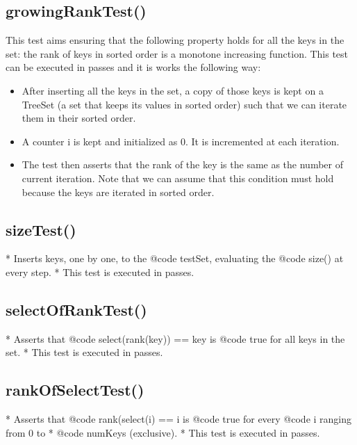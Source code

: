 \subsection{{\ttfamily growingRankTest()}} This test aims ensuring that the following property holds for all the keys in the set: the rank of keys in sorted order is a monotone increasing function. This test can be executed in passes and it is works the following way:
\begin{itemize}
    \item After inserting all the keys in the set, a copy of those keys is kept on a {\ttfamily TreeSet} (a set that keeps its values in sorted order) such that we can iterate them in their sorted order.
    \item A counter {\ttfamily i} is kept and initialized as $0$. It is incremented at each iteration.
    \item The test then asserts that the rank of the key is the same as the number of current iteration. Note that we can assume that this condition must hold because the keys are iterated in sorted order. 
\end{itemize}

\subsection{{\ttfamily sizeTest()}}
   * Inserts keys, one by one, to the {@code testSet}, evaluating the {@code size()} at every step.
   * This test is executed in passes.

\subsection{{\ttfamily selectOfRankTest()}}

   * Asserts that {@code select(rank(key)) == key} is {@code true} for all keys in the set.
   * This test is executed in passes.

\subsection{{\ttfamily rankOfSelectTest()}}

   * Asserts that {@code rank(select(i) == i} is {@code true} for every {@code i} ranging from 0 to
   * {@code numKeys} (exclusive).
   * This test is executed in passes.